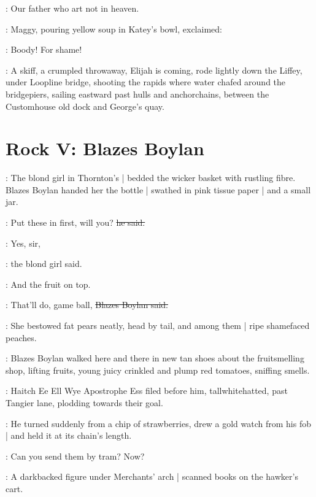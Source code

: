 \boody:
Our father who art not in heaven.

:
Maggy,
pouring yellow soup in Katey's bowl,
exclaimed:

\maggy:
Boody!
For shame!

\begin{interject}
    :
    A skiff,
    a crumpled throwaway,
    Elijah is coming,
    rode lightly down the Liffey,
    under Loopline bridge,
    shooting the rapids where water chafed around the bridgepiers,
    sailing eastward past hulls and anchorchains,
    between the Custom\-house old dock and George's quay.
\end{interject}


\section*{Rock V: Blazes Boylan}

:
The blond girl in Thornton's |
bedded the wicker basket with rustling fibre.%
Blazes Boylan handed her the bottle |
swathed in pink tissue paper |
and a small jar.

\boylan:
Put these in first, will you?
\sout{he said.}

\blondgirl:
Yes, sir,

:
the blond girl said.

\blondgirl:
And the fruit on top.

\boylan:
That'll do, game ball,
\sout{Blazes Boylan said.}

:
She bestowed fat pears neatly,
head by tail,
and among them |
ripe shamefaced peaches.

:
Blazes Boylan walked here and there in new tan shoes
about the fruit\-smell\-ing shop,
lifting fruits,
young juicy crinkled and plump red tomatoes,
sniffing smells.

\begin{interject}
    :
    Haitch Ee Ell Wye Apostrophe Ess \stage{[H.E.L.Y.'S]}
    filed before him, tall\-white\-hatted,
    past Tangier lane,
    plodding towards their goal.
\end{interject}%

:
He turned suddenly from a chip of strawberries,
drew a gold watch from his fob |
and held it at its chain's length.

\boylan:
Can you send them by tram? Now?

\begin{interject}
    :
    A darkbacked figure under Merchants' arch |
    scanned books on the hawker's cart.
\end{interject}

